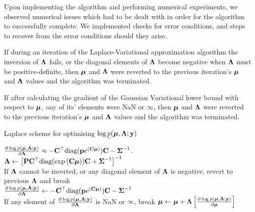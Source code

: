 	Upon implementing the algorithm and performing numerical experiments, we observed numerical issues which had to be dealt with in 
	order for the algorithm to successfully complete.
	We implemented checks for error conditions, and steps to recover from the error conditions should
	they arise.

	If during an iteration of the Laplace-Variational approximation algorithm the inversion  of ${\boldsymbol \Lambda}$
	fails, or the diagonal elements of ${\boldsymbol \Lambda}$ become negative when ${\boldsymbol \Lambda}$ must be positive-definite,
	then ${\boldsymbol \mu}$ and ${\boldsymbol \Lambda}$ were reverted to the previous iteration's ${\boldsymbol \mu}$ and ${\boldsymbol \Lambda}$ values and
	the algorithm was terminated.

	If after calculating the gradient of the Gaussian Variational lower bound with respect to ${\boldsymbol \mu}$, any of
	its' elements were NaN or $\infty$, then ${\boldsymbol \mu}$ and ${\boldsymbol \Lambda}$ were reverted to the previous iteration's
	${\boldsymbol \mu}$ and ${\boldsymbol \Lambda}$ values and the algorithm was terminated.
			
	\begin{algorithm}
		\caption{Laplace scheme for optimising $\log \underline{p}({\boldsymbol \mu}, {\boldsymbol \Lambda}; {\bf y})$}
		\label{alg:laplace_alg}
		\begin{algorithmic}
			\REQUIRE $\frac{\partial \log p({\boldsymbol \mu}, {\boldsymbol \Lambda}; {\bf y})}{\partial {\boldsymbol\Lambda}} \approx - {\bf C}^\top \text{diag}({\bf p} e^{({\bf C} {\boldsymbol \mu})}) {\bf C} - {\boldsymbol \Sigma}^{-1}$.
			\STATE ${\boldsymbol \Lambda} \leftarrow \left [{\bf P} {\bf C}^\top \text{diag}(\exp{({\bf C}{\boldsymbol\mu})}) {\bf C} + {\boldsymbol \Sigma}^{-1} \right ]^{-1}$ \\ [1ex] 
			If ${\boldsymbol \Lambda}$ cannot be inverted, or any diagonal element of ${\boldsymbol \Lambda}$ is negative, revert to previous
			${\boldsymbol \Lambda}$ and break \\ [1ex]
			\STATE $\frac{\partial \log p({\boldsymbol \mu}, {\boldsymbol \Lambda}; {\bf y})}{\partial {\boldsymbol\Lambda}}
			\leftarrow - {\bf C}^\top \text{diag}({\bf p} e^{({\bf C} {\boldsymbol \mu})}) {\bf C} - {\boldsymbol \Sigma}^{-1}$ \\ [1ex]
			If any element of $\frac{\partial \log p({\boldsymbol \mu}, {\boldsymbol \Lambda}; {\bf y})}{\partial {\boldsymbol\Lambda}}$ is NaN or $\infty$,
			break
			\STATE ${\boldsymbol \mu} \leftarrow {\boldsymbol\mu} + {\boldsymbol \Lambda} \left [ \frac{\partial \log p({\boldsymbol \mu}, {\boldsymbol \Lambda}; {\bf y})}{\partial {\boldsymbol\mu}} \right ]$ \\ [1ex]
			\ENDWHILE
		\end{algorithmic}
	\end{algorithm}
			
